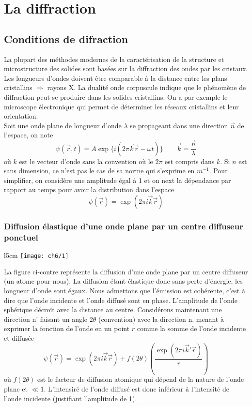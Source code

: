 
\chapter{La diffraction}
\section{Conditions de difraction}
	La plupart des méthodes modernes de la caractérisation de la structure et microstructure des solides sont basées sur la diffraction des ondes par les cristaux. Les longueurs d'ondes doivent être comparable à la distance entre les plans cristallins $\Rightarrow$ rayons X. La dualité onde corpuscule indique que le phénomène de diffraction peut se produire dans les solides cristallins. On a par exemple le microscope électronique qui permet de déterminer les réseaux cristallins et leur orientation. \\
	Soit une onde plane de longueur d'onde $\lambda$ se propageant dans une direction $\vec{n}$ de l'espace, on note
	\begin{equation}
		\psi (\vec{r},t)= A \exp \{i(2\pi \vec{k}\vec{r}-\omega t)\}\qquad \vec{k} = \frac{\vec{n}}{\lambda}
	\end{equation}
	où $k$ est le vecteur d'onde sans la convention où le $2\pi$ est compris dans $k$. Si $n$ est sans dimension, ce n'est pas le cas de sa norme qui s'exprime en $m^{-1}$. Pour simplifier, on considère une amplitude égal à 1 et on next la dépendance par rapport au temps pour avoir la distribution dans l'espace
	\begin{equation}
		\psi (\vec{r}) = \exp (2\pi i \vec{k}\vec{r})
	\end{equation}
	
	\subsection{Diffusion élastique d'une onde plane par un centre diffuseur ponctuel}
	\begin{wrapfigure}[6]{l}{5cm}
	\vspace{-5mm}
	\texttt{[image: ch6/1]}
	\end{wrapfigure}
	La figure ci-contre représente la diffusion d'une onde plane par un centre diffuseur (un atome pour nous). La diffusion étant élastique donc sans perte d'énergie, les longueur d'onde sont égaux. Nous admettons que l'émission est cohérente, c'est à dire que l'onde incidente et l'onde diffusé sont en phase. L'amplitude de l'onde sphérique décroît avec la distance au centre. Considérons maintenant une direction n' faisant un angle $2\theta$ (convention) avec la direction n, menant à exprimer la fonction de l'onde en un point $r$ comme la somme de l'onde incidente et diffusée
	\begin{equation}
		\psi (\vec{r}) = \exp (2\pi i \vec{k}\vec{r}) + f(2\theta )\left(\frac{\exp (2\pi i \vec{k}'\vec{r})}{r} \right)
	\end{equation}
	où $f(2\theta )$ est le facteur de diffusion atomique qui dépend de la nature de l'onde plane et $\ll 1$. L'intensiré de l'onde diffusé est donc inférieur à l'intensité de l'onde incidente (justifiant l'amplitude de 1).   
	
